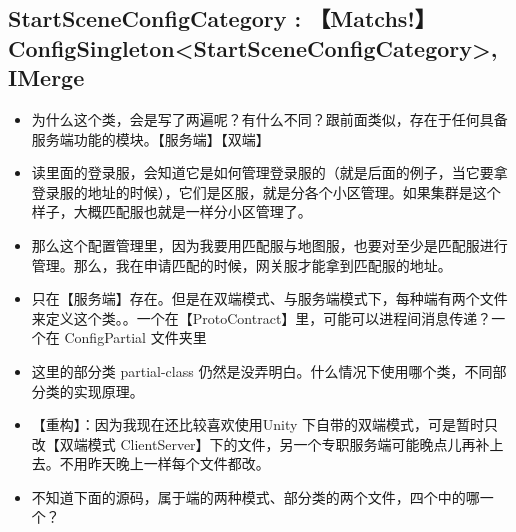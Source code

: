 \documentclass[9pt, b5paper]{article}
\begin{document}
\subsection{StartSceneConfigCategory : 【Matchs!】ConfigSingleton<StartSceneConfigCategory>, IMerge}
\label{sec-6-10}
\begin{itemize}
\item 为什么这个类，会是写了两遍呢？有什么不同？跟前面类似，存在于任何具备服务端功能的模块。【服务端】【双端】
\item 读里面的登录服，会知道它是如何管理登录服的（就是后面的例子，当它要拿登录服的地址的时候），它们是区服，就是分各个小区管理。如果集群是这个样子，大概匹配服也就是一样分小区管理了。
\item 那么这个配置管理里，因为我要用匹配服与地图服，也要对至少是匹配服进行管理。那么，我在申请匹配的时候，网关服才能拿到匹配服的地址。
\item 只在【服务端】存在。但是在双端模式、与服务端模式下，每种端有两个文件来定义这个类。。一个在【ProtoContract】里，可能可以进程间消息传递？一个在 ConfigPartial 文件夹里
\item 这里的部分类 partial-class 仍然是没弄明白。什么情况下使用哪个类，不同部分类的实现原理。
\item 【重构】：因为我现在还比较喜欢使用Unity 下自带的双端模式，可是暂时只改【双端模式 ClientServer】下的文件，另一个专职服务端可能晚点儿再补上去。不用昨天晚上一样每个文件都改。
\item 不知道下面的源码，属于端的两种模式、部分类的两个文件，四个中的哪一个？
\end{itemize}
\end{document}
